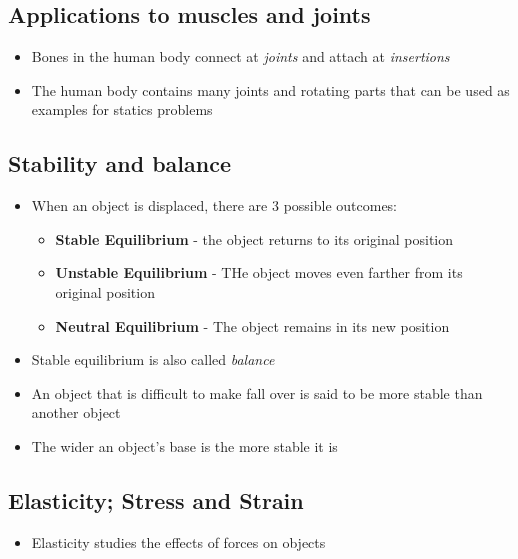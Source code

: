 \subsection{Applications to muscles and joints}
\begin{itemize}
    \item Bones in the human body connect at \emph{joints} and attach at \emph{insertions}
    \item The human body contains many joints and rotating parts that can be used as examples for statics problems
\end{itemize}

\subsection{Stability and balance}
\begin{itemize}
    \item When an object is displaced, there are 3 possible outcomes:
    \begin{itemize}
        \item \textbf{Stable Equilibrium} - the object returns to its original position
        \item \textbf{Unstable Equilibrium} - THe object moves even farther from its original position
        \item \textbf{Neutral Equilibrium} - The object remains in its new position
    \end{itemize}
    \item Stable equilibrium is also called \emph{balance}
    \item An object that is difficult to make fall over is said to be more stable than another object
    \item The wider an object's base is the more stable it is
\end{itemize}

\subsection{Elasticity; Stress and Strain}
\begin{itemize}
    \item Elasticity studies the effects of forces on objects 
\end{itemize}

